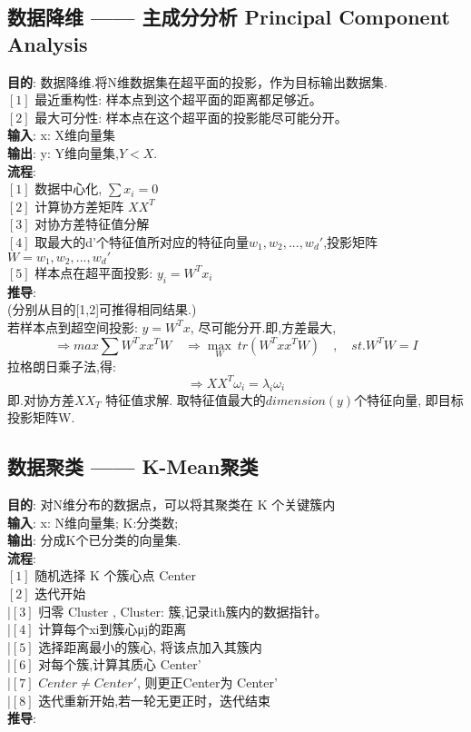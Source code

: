 \documentclass{article}
\begin{document}
\subsection{数据降维 —— 主成分分析 Principal Component Analysis}
\textbf{目的}: 数据降维.将N维数据集在超平面的投影，作为目标输出数据集.\\
$[1]$ 最近重构性: 样本点到这个超平面的距离都足够近。\\
$[2]$ 最大可分性: 样本点在这个超平面的投影能尽可能分开。\\
\textbf{输入}: x: X维向量集\\
\textbf{输出}: y: Y维向量集,$Y < X$.\\
\textbf{流程}:\\
$[1]$ 数据中心化, $\sum x_i = 0$\\
$[2]$ 计算协方差矩阵 $X X^T$\\
$[3]$ 对协方差特征值分解\\
$[4]$ 取最大的d'个特征值所对应的特征向量${w_1,w_2,...,w_d'}$,投影矩阵$W = {w_1,w_2,...,w_d'}$\\
$[5]$ 样本点在超平面投影: $y_i = W^T x_i$\\
\textbf{推导}:\\
(分别从目的[1,2]可推得相同结果.)\\
若样本点到超空间投影: $y = W^T x$, 尽可能分开.即,方差最大,\
$$\Rightarrow max \sum W^T x x^T W \quad \Rightarrow \max_W\ tr( W^T x x^T W ) \quad ,\quad st. W^T W = I$$
拉格朗日乘子法,得:	
$$\Rightarrow X X^T ω_i = \lambda_i \omega_i$$
即.对协方差$X X_T$ 特征值求解. 取特征值最大的$dimension(y)$个特征向量, 即目标投影矩阵W.


\subsection{数据聚类 —— K-Mean聚类}
\textbf{目的}: 对N维分布的数据点，可以将其聚类在 K 个关键簇内\\
\textbf{输入}: x: N维向量集; K:分类数;\\
\textbf{输出}: 分成K个已分类的向量集.\\
\textbf{流程}:\\
$[1]$ 随机选择 K 个簇心点 Center\\
$[2]$ 迭代开始\\ 
|\quad $[3]$ 归零 Cluster , Cluster: 簇,记录ith簇内的数据指针。\\ 
|\quad $[4]$ 计算每个xi到簇心μj的距离\\
|\quad $[5]$ 选择距离最小的簇心, 将该点加入其簇内\\
|\quad $[6]$ 对每个簇,计算其质心 Center'\\
|\quad $[7]$ $Center \neq Center'$, 则更正Center为 Center'\\
|\quad $[8]$ 迭代重新开始,若一轮无更正时，迭代结束\\
\textbf{推导}:\\
\end{document}
